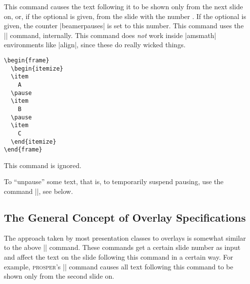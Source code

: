 \begin{command}{\pause{}}
  This command causes the text following it to be shown only from the next slide on, or, if the optional  is given, from the slide with the number . If the optional  is given, the counter |beamerpauses| is set to this number. This command uses the |\onslide| command, internally. This command does \emph{not} work inside |amsmath| environments like |align|, since these do really wicked things.

  \example
\begin{verbatim}
\begin{frame}
  \begin{itemize}
  \item
    A
  \pause
  \item
    B
  \pause
  \item
    C
  \end{itemize}
\end{frame}
\end{verbatim}

  \articlenote
  This command is ignored.

\end{command}

To ``unpause'' some text, that is, to temporarily suspend pausing, use the command |\onslide|, see below.


\subsection{The General Concept of Overlay Specifications}
\label{section-concept-overlays}

The approach taken by most presentation classes to overlays is somewhat similar to the above |\pause| command. These commands get a certain slide number as input and affect the text on the slide following this command in a certain way. For example, \textsc{prosper}'s || command causes all text following this command to be shown only from the second slide on.

